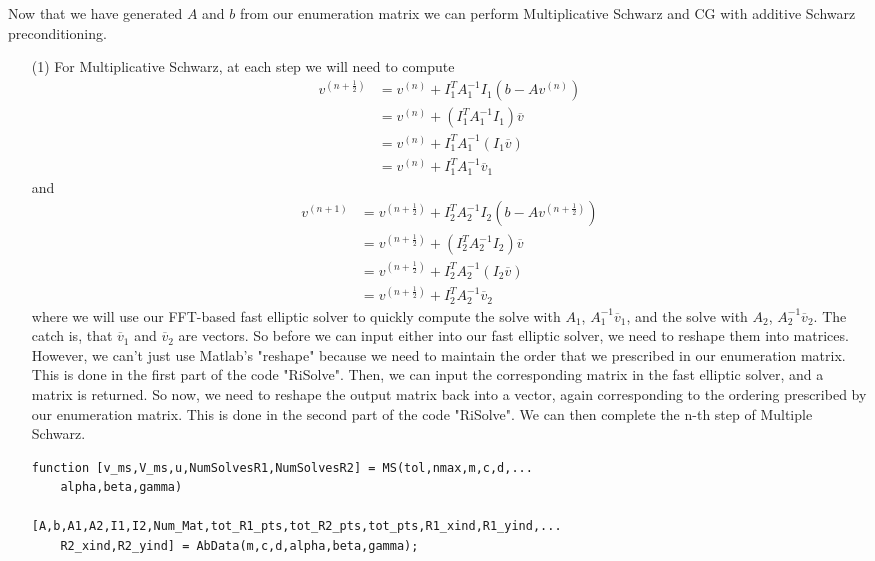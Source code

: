 \documentclass[12pt]{article}
\begin{document}
Now that we have generated $A$ and $b$ from our enumeration matrix we can perform Multiplicative Schwarz and CG with additive Schwarz preconditioning.\\
\begin{itemize}
\item[(1)]  For Multiplicative Schwarz, at each step we will need to compute
\begin{align*}
v^{(n+\frac{1}{2})} &= v^{(n)} + I_1^TA_1^{-1}I_1(b - Av^{(n)}) \\
&= v^{(n)} + \left(I_1^TA_1^{-1}I_1\right)\overline{v} \\
&= v^{(n)} + I_1^TA_1^{-1}\left(I_1\overline{v}\right) \\
&= v^{(n)} + I_1^TA_1^{-1}\overline{v}_1
\end{align*}
and
\begin{align*}
v^{(n+1)} &= v^{(n+\frac{1}{2})} + I_2^TA_2^{-1}I_2(b - Av^{(n+\frac{1}{2})}) \\
&= v^{(n+\frac{1}{2})} + \left(I_2^TA_2^{-1}I_2\right)\overline{v} \\
&= v^{(n+\frac{1}{2})} + I_2^TA_2^{-1}\left(I_2\overline{v}\right) \\
&= v^{(n+\frac{1}{2})} + I_2^TA_2^{-1}\overline{v}_2
\end{align*}
where we will use our FFT-based fast elliptic solver to quickly compute the solve with $A_1$, $A_1^{-1}\overline{v}_1$, and the solve with $A_2$, $A_2^{-1}\overline{v}_2$.  The catch is, that $\overline{v}_1$ and $\overline{v}_2$ are vectors.  So before we can input either into our fast elliptic solver, we need to reshape them into matrices.  However, we can't just use Matlab's "reshape" because we need to maintain the order that we prescribed in our enumeration matrix.  This is done in the first part of the code "RiSolve".  Then, we can input the corresponding matrix in the fast elliptic solver, and a matrix is returned.  So now, we need to reshape the output matrix back into a vector, again corresponding to the ordering prescribed by our enumeration matrix.  This is done in the second part of the code "RiSolve".  We can then complete the n-th step of Multiple Schwarz.\\

\lstset{language=matlab,frame=single}
\begin{lstlisting}[caption=Multiplicative Schwarz Function]
function [v_ms,V_ms,u,NumSolvesR1,NumSolvesR2] = MS(tol,nmax,m,c,d,...
    alpha,beta,gamma)

[A,b,A1,A2,I1,I2,Num_Mat,tot_R1_pts,tot_R2_pts,tot_pts,R1_xind,R1_yind,...
    R2_xind,R2_yind] = AbData(m,c,d,alpha,beta,gamma);


\end{lstlisting}
\end{itemize}
\end{document}
